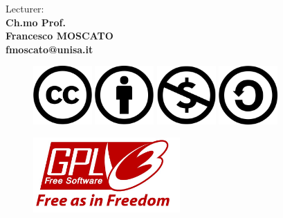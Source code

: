 \documentclass[a4paper, 11pt, oneside]{book}
\begin{document}
\begin{titlepage}
    \vspace{10mm}
    \noindent
   \begin{minipage}[t]{0.47\textwidth}
   	{\large{ Lecturer:\\\bf Ch.mo Prof. \\Francesco MOSCATO \\fmoscato@unisa.it}}
    \vspace{10mm}\\
   	\begin{figure}[H]
        \includegraphics[width=0.2\textwidth]{img/cc.xlarge.png}
        \includegraphics[width=0.2\textwidth]{img/by.xlarge.png}
        \includegraphics[width=0.2\textwidth]{img/nc.xlarge.png}
        \includegraphics[width=0.2\textwidth]{img/sa.xlarge.png}
    \end{figure}
    \begin{figure}[H]
        \includegraphics[width=0.5\textwidth]{img/gpl3.jpg}

\end{figure}
\end{minipage}
\end{titlepage}
\end{document}
